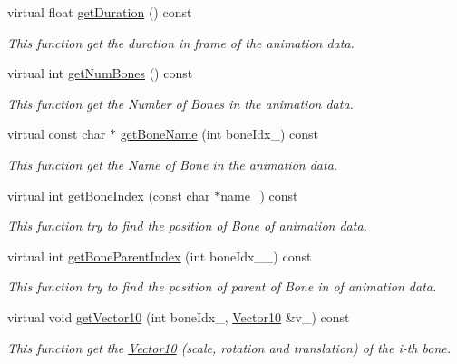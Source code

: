 \begin{DoxyCompactItemize}
virtual float \hyperlink{class_magnum_1_1_skeletal_animation_ac2b3b3ded7fc4100e44390fda80b243d}{get\+Duration} () const 
\begin{DoxyCompactList}\small\item\em This function get the duration in frame of the animation data. \end{DoxyCompactList}\item 
virtual int \hyperlink{class_magnum_1_1_skeletal_animation_aae3d05536af25e2bde8736e4f37235e8}{get\+Num\+Bones} () const 
\begin{DoxyCompactList}\small\item\em This function get the Number of Bones in the animation data. \end{DoxyCompactList}\item 
virtual const char $\ast$ \hyperlink{class_magnum_1_1_skeletal_animation_a872518695359f22a10be31ddb99f95bd}{get\+Bone\+Name} (int bone\+Idx\+\_\+) const 
\begin{DoxyCompactList}\small\item\em This function get the Name of Bone in the animation data. \end{DoxyCompactList}\item 
virtual int \hyperlink{class_magnum_1_1_skeletal_animation_a288b1017087bb5bda164c10d32fb4cdd}{get\+Bone\+Index} (const char $\ast$name\+\_\+) const 
\begin{DoxyCompactList}\small\item\em This function try to find the position of Bone of animation data. \end{DoxyCompactList}\item 
virtual int \hyperlink{class_magnum_1_1_skeletal_animation_adbdc94caa3a1a1e0711515bf8d2fe39b}{get\+Bone\+Parent\+Index} (int bone\+Idx\+\_\+\+\_\+) const 
\begin{DoxyCompactList}\small\item\em This function try to find the position of parent of Bone in of animation data. \end{DoxyCompactList}\item 
virtual void \hyperlink{class_magnum_1_1_skeletal_animation_a7c4a6ec45a2dbcc9b68612b26e897e18}{get\+Vector10} (int bone\+Idx\+\_\+, \hyperlink{class_magnum_1_1_vector10}{Vector10} \&v\+\_\+) const 
\begin{DoxyCompactList}\small\item\em This function get the \hyperlink{class_magnum_1_1_vector10}{Vector10} (scale, rotation and translation) of the i-\/th bone. \end{DoxyCompactList}\item 

\end{DoxyCompactItemize}
